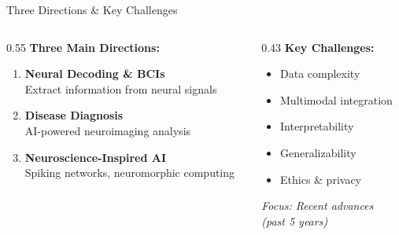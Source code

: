 \documentclass[aspectratio=169]{beamer}
\begin{document}
\begin{frame}{Three Directions \& Key Challenges}
  \begin{columns}[T]
    \begin{column}{0.55\textwidth}
      \textbf{Three Main Directions:}
      \begin{enumerate}
        \item \textbf{Neural Decoding \& BCIs}\\
        {\small Extract information from neural signals}
        
        \item \textbf{Disease Diagnosis}\\
        {\small AI-powered neuroimaging analysis}
        
        \item \textbf{Neuroscience-Inspired AI}\\
        {\small Spiking networks, neuromorphic computing}
      \end{enumerate}
    \end{column}
    
    \begin{column}{0.43\textwidth}
      \textbf{Key Challenges:}
      \begin{itemize}
        \item Data complexity
        \item Multimodal integration
        \item Interpretability
        \item Generalizability
        \item Ethics \& privacy
      \end{itemize}
      
      \vspace{0.5em}
      
      \textit{\small Focus: Recent advances\\(past 5 years)}
    \end{column}
  \end{columns}
\end{frame}
\end{document}
